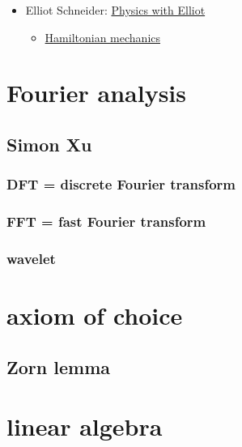 \documentclass[
]{book}
\providecommand{\tightlist}{%
  \setlength{\itemsep}{0pt}\setlength{\parskip}{0pt}}
\theoremstyle{definition}
\theoremstyle{definition}
\theoremstyle{definition}
\theoremstyle{definition}
\theoremstyle{remark}
\begin{document}
\begin{itemize}
\tightlist
\item
  Elliot Schneider: \href{https://www.youtube.com/@PhysicswithElliot/playlists}{Physics with Elliot}

  \begin{itemize}
  \tightlist
  \item
    \href{https://www.youtube.com/playlist?list=PL-IZN8QRUw-zBECgfYLuDQ3qkWsXWAGhM}{Hamiltonian mechanics}
  \end{itemize}
\end{itemize}

\chapter{Fourier analysis}\label{fourier-analysis}

\section{Simon Xu}\label{simon-xu}

\subsection{DFT = discrete Fourier transform}\label{dft-discrete-fourier-transform}

\subsection{FFT = fast Fourier transform}\label{fft-fast-fourier-transform}

\subsection{wavelet}\label{wavelet}

\chapter{axiom of choice}\label{axiom-of-choice}

\section{Zorn lemma}\label{zorn-lemma}

\chapter{linear algebra}\label{linear-algebra}
\end{document}
